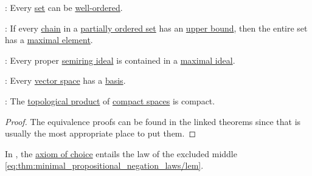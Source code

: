 \begin{theorem}
\begin{thmenum}[resume=thm:axiom_of_choice_equivalences]
     : Every \hyperref[def:set]{set} can be \hyperref[def:well_ordered_set]{well-ordered}.

     : If every \hyperref[def:partial_order_chain]{chain} in a \hyperref[def:partially_ordered_set]{partially ordered set} has an \hyperref[def:extremal_points/bounds]{upper bound}, then the entire set has a \hyperref[def:extremal_points/maximal_and_minimal_element]{maximal element}.

     : Every proper \hyperref[def:semiring_ideal]{semiring ideal} is contained in a \hyperref[def:semiring_ideal/maximal]{maximal ideal}.

     : Every \hyperref[def:vector_space]{vector space} has a \hyperref[def:hamel_basis]{basis}.

     : The \hyperref[def:topological_product]{topological product} of \hyperref[def:compact_space]{compact spaces} is compact.
  \end{thmenum}
\end{theorem}
\begin{proof}
  The equivalence proofs can be found in the linked theorems since that is usually the most appropriate place to put them.
\end{proof}

\begin{theorem}\label{thm:diaconescu_goodman_myhill_theorem}
  In \hyperref[def:zfc]{}, the \hyperref[def:zfc/choice]{axiom of choice} entails the law of the excluded middle \eqref{eq:thm:minimal_propositional_negation_laws/lem}.
\end{theorem}

